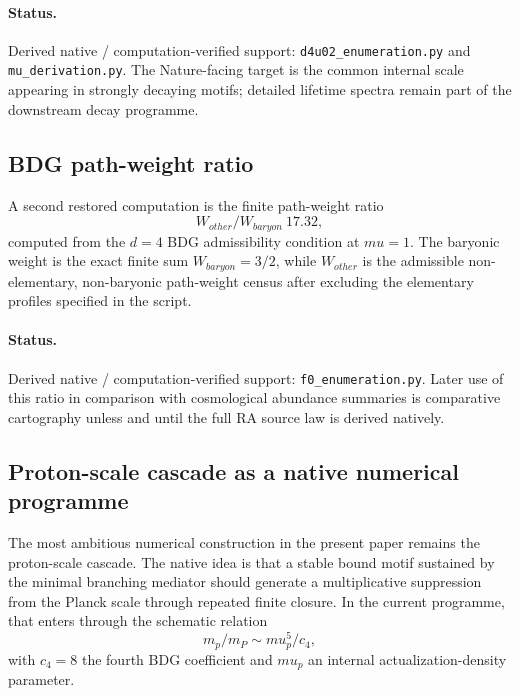 \documentclass[11pt]{article}
\def\mu{mu}%
\def\mathrm#1{#1}%
\def\frac#1#2{#1/#2}%
\def\approx{~}%
\begin{document}
\paragraph{Status.} Derived native / computation-verified support: \texttt{d4u02\_enumeration.py} and \texttt{mu\_derivation.py}. The Nature-facing target is the common internal scale appearing in strongly decaying motifs; detailed lifetime spectra remain part of the downstream decay programme.

\subsection{BDG path-weight ratio}

A second restored computation is the finite path-weight ratio
\begin{equation}
\frac{W_{\mathrm{other}}}{W_{\mathrm{baryon}}}\approx 17.32,
\end{equation}
computed from the \(d=4\) BDG admissibility condition at \(\mu=1\). The baryonic weight is the exact finite sum \(W_{\mathrm{baryon}}=3/2\), while \(W_{\mathrm{other}}\) is the admissible non-elementary, non-baryonic path-weight census after excluding the elementary profiles specified in the script.

\paragraph{Status.} Derived native / computation-verified support: \texttt{f0\_enumeration.py}. Later use of this ratio in comparison with cosmological abundance summaries is comparative cartography unless and until the full RA source law is derived natively.

\subsection{Proton-scale cascade as a native numerical programme}

The most ambitious numerical construction in the present paper remains the proton-scale cascade. The native idea is that a stable bound motif sustained by the minimal branching mediator should generate a multiplicative suppression from the Planck scale through repeated finite closure. In the current programme, that enters through the schematic relation
\begin{equation}
\frac{m_p}{m_P} \sim \frac{\mu_p^5}{c_4},
\end{equation}
with $c_4=8$ the fourth BDG coefficient and $\mu_p$ an internal actualization-density parameter.
\end{document}
